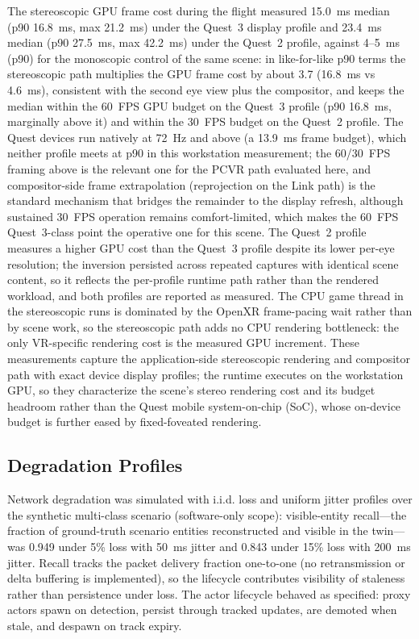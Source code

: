 \documentclass[fleqn]{VRIH2025}
\begin{document}
The stereoscopic GPU frame cost during the flight measured 15.0~ms median (p90 16.8~ms, max 21.2~ms) under the Quest~3 display profile and 23.4~ms median (p90 27.5~ms, max 42.2~ms) under the Quest~2 profile, against 4--5~ms (p90) for the monoscopic control of the same scene: in like-for-like p90 terms the stereoscopic path multiplies the GPU frame cost by about 3.7 (16.8~ms vs 4.6~ms), consistent with the second eye view plus the compositor, and keeps the median within the 60~FPS GPU budget on the Quest~3 profile (p90 16.8~ms, marginally above it) and within the 30~FPS budget on the Quest~2 profile. The Quest devices run natively at 72~Hz and above (a 13.9~ms frame budget), which neither profile meets at p90 in this workstation measurement; the 60/30~FPS framing above is the relevant one for the PCVR path evaluated here, and compositor-side frame extrapolation (reprojection on the Link path) is the standard mechanism that bridges the remainder to the display refresh, although sustained 30~FPS operation remains comfort-limited, which makes the 60~FPS Quest~3-class point the operative one for this scene. The Quest~2 profile measures a higher GPU cost than the Quest~3 profile despite its lower per-eye resolution; the inversion persisted across repeated captures with identical scene content, so it reflects the per-profile runtime path rather than the rendered workload, and both profiles are reported as measured. The CPU game thread in the stereoscopic runs is dominated by the OpenXR frame-pacing wait rather than by scene work, so the stereoscopic path adds no CPU rendering bottleneck: the only VR-specific rendering cost is the measured GPU increment. These measurements capture the application-side stereoscopic rendering and compositor path with exact device display profiles; the runtime executes on the workstation GPU, so they characterize the scene's stereo rendering cost and its budget headroom rather than the Quest mobile system-on-chip (SoC), whose on-device budget is further eased by fixed-foveated rendering.

\subsection{Degradation Profiles}
\label{sec:degradation}
Network degradation was simulated with i.i.d. loss and uniform jitter profiles over the synthetic multi-class scenario (software-only scope): visible-entity recall---the fraction of ground-truth scenario entities reconstructed and visible in the twin---was 0.949 under 5\% loss with 50~ms jitter and 0.843 under 15\% loss with 200~ms jitter. Recall tracks the packet delivery fraction one-to-one (no retransmission or delta buffering is implemented), so the lifecycle contributes visibility of staleness rather than persistence under loss. The actor lifecycle behaved as specified: proxy actors spawn on detection, persist through tracked updates, are demoted when stale, and despawn on track expiry.
\end{document}
